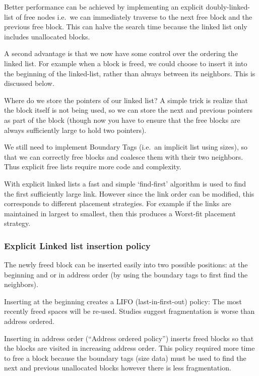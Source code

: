 Better performance can be achieved by implementing an explicit
doubly-linked-list of free nodes i.e.~we can immediately traverse to the
next free block and the previous free block. This can halve the search
time because the linked list only includes unallocated blocks.

A second advantage is that we now have some control over the ordering
the linked list. For example when a block is freed, we could choose to
insert it into the beginning of the linked-list, rather than always
between its neighbors. This is discussed below.

Where do we store the pointers of our linked list? A simple trick is
realize that the block itself is not being used, so we can store the
next and previous pointers as part of the block (though now you have to
ensure that the free blocks are always sufficiently large to hold two
pointers).

We still need to implement Boundary Tags (i.e.~an implicit list using
sizes), so that we can correctly free blocks and coalesce them with
their two neighbors. Thus explicit free lists require more code and
complexity.

With explicit linked lists a fast and simple `find-first' algorithm is
used to find the first sufficiently large link. However since the link
order can be modified, this corresponds to different placement
strategies. For example if the links are maintained in largest to
smallest, then this produces a Worst-fit placement strategy.

\subsubsection{Explicit Linked list insertion
policy}\label{explicit-linked-list-insertion-policy}

The newly freed block can be inserted easily into two possible
positions: at the beginning and or in address order (by using the
boundary tags to first find the neighbors).

Inserting at the beginning creates a LIFO (last-in-first-out) policy:
The most recently freed spaces will be re-used. Studies suggest
fragmentation is worse than address ordered.

Inserting in address order (``Address ordered policy'') inserts freed
blocks so that the blocks are visited in increasing address order. This
policy required more time to free a block because the boundary tags
(size data) must be used to find the next and previous unallocated
blocks however there is less fragmentation.

